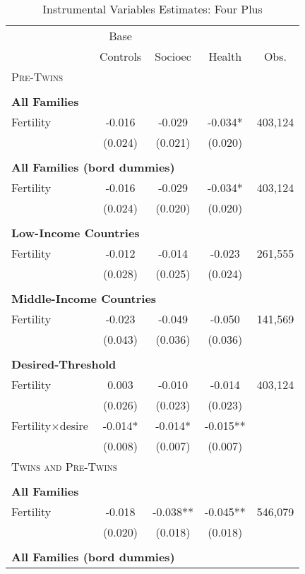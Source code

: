 \begin{table}[!htbp] \centering 
\caption{Instrumental Variables Estimates: Four Plus} 
\label{TWINtab:IVFourplus} 
\begin{tabular}{lcccc} \toprule \toprule 
&Base&&&\\
&Controls&Socioec&Health&Obs.\\\midrule
\multicolumn{5}{l}{\textsc{Pre-Twins}}\\ 
&&&&\\
\multicolumn{5}{l}{\textbf{All Families}}\\ 
Fertility&-0.016&-0.029&-0.034*&403,124\\
         &(0.024)&(0.021)&(0.020)&\\
&&&&\\
\multicolumn{5}{l}{\textbf{All Families (bord dummies)}}\\ 
Fertility&-0.016&-0.029&-0.034*&403,124\\
         &(0.024)&(0.020)&(0.020)&\\
&&&&\\
\multicolumn{5}{l}{\textbf{Low-Income Countries}}\\ 
Fertility&-0.012&-0.014&-0.023&261,555\\
         &(0.028)&(0.025)&(0.024)&\\
&&&&\\
\multicolumn{5}{l}{\textbf{Middle-Income Countries}}\\ 
Fertility&-0.023&-0.049&-0.050&141,569\\
         &(0.043)&(0.036)&(0.036)&\\
&&&&\\
\multicolumn{5}{l}{\textbf{Desired-Threshold}}\\ 
Fertility&0.003&-0.010&-0.014&403,124\\
         &(0.026)&(0.023)&(0.023)&\\
Fertility$\times$desire&-0.014*&-0.014*&-0.015**&\\
         &(0.008)&(0.007)&(0.007)&\\
\midrule\multicolumn{5}{l}{\textsc{Twins and Pre-Twins}}\\ 
&&&&\\
\multicolumn{5}{l}{\textbf{All Families}}\\ 
Fertility&-0.018&-0.038**&-0.045**&546,079\\
         &(0.020)&(0.018)&(0.018)&\\
&&&&\\
\multicolumn{5}{l}{\textbf{All Families (bord dummies)}}\\ 

\end{tabular}
\end{table}
